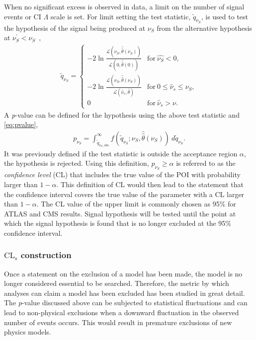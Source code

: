 When no significant excess is observed in data, a limit on the number of signal events or CI $\Lambda$ scale is set. For limit setting the test statistic, $\tilde{q}_{\nu_S}$, is used to test the hypothesis of the signal being produced at $\nu_S$ from the alternative hypothesis at $\nu_S^\prime < \nu_S$~\cite{Cowan:2010js},
\begin{equation}
    \label{eq:limitTestStat}
    \begin{aligned}
    \tilde{q}_{\nu_S} = \begin{cases}
        -2\ln\frac{\mathcal{L}(\nu_S,\hat{\hat{\theta}}(\nu_S))}{\mathcal{L}(0,\hat{\hat{\theta}}(0))} & \mathrm{for }~\hat{\nu_S} < 0, \\
        -2\ln\frac{\mathcal{L}(\nu_S,\hat{\hat{\theta}}(\nu_S))}{\mathcal{L}(\hat{\nu}_s,\hat{\theta})} & \mathrm{for }~0 \leq \hat{\nu}_s \leq \nu_S, \\
        0          & \mathrm{for }~\hat{\nu}_s > \nu.
    \end{cases}
    \end{aligned}
\end{equation}
A \emph{p}-value can be defined for the hypothesis using the above test statistic and \cref{eq:pvalue}, 
\begin{equation}
    \label{eq:pvalue_sb}
    \begin{aligned}
        p_{\nu_S} = \int_{\tilde{q}_{\nu_S,obs}}^\infty f(\tilde{q}_{\nu_S};\nu_S,\hat{\hat{\theta}}(\nu_S))~d\tilde{q}_{\nu_S}.
    \end{aligned}
\end{equation}
It was previously defined if the test statistic is outside the acceptance region $\alpha$, the hypothesis is rejected. Using this definition, $p_{\nu_S} \geq \alpha$ is referred to as the \emph{confidence level} (CL) that includes the true value of the POI with probability larger than $1-\alpha$. This definition of CL would then lead to the statement that the confidence interval covers the true value of the parameter with a CL larger than $1-\alpha$. The CL value of the upper limit is commonly chosen as 95\% for ATLAS and CMS results. Signal hypothesis will be tested until the point at which the signal hypothesis is found that is no longer excluded at the 95\% confidence interval. 

\subsubsection{$\mathrm{CL}_\mathrm{s}$ construction}
Once a statement on the exclusion of a model has been made, the model is no longer considered essential to be searched. Therefore, the metric by which analyses can claim a model has been excluded has been studied in great detail. The \emph{p}-value discussed above can be subjected to statistical fluctuations and can lead to non-physical exclusions when a downward fluctuation in the observed number of events occurs. This would result in premature exclusions of new physics models. 

